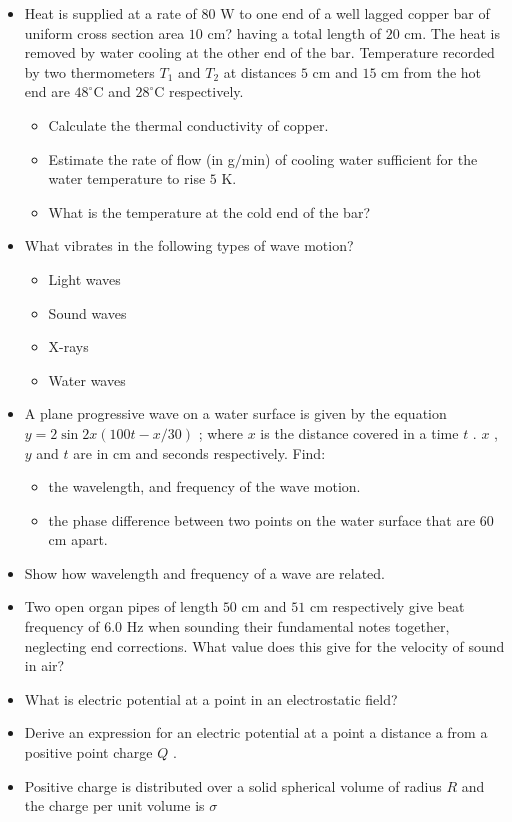 \documentclass{article}
\begin{document}
\begin{itemize}
\item Heat is supplied at a rate of $ 80$ W to one end of a well lagged copper bar of uniform cross section area $ 10$ cm? having a total length of $ 20$ cm. The heat is removed by water cooling at the other end of the bar. Temperature recorded by two thermometers $ T_{1}$ and $ T_{2}$ at distances $ 5$ cm and $ 15$ cm from the hot end are $ 48^{\circ}$C and $ 28^{\circ}$C respectively.
 \begin{itemize}
\item Calculate the thermal conductivity of copper.
\item Estimate the rate of flow (in g$/$min) of cooling water sufficient for the water temperature to rise $ 5$ K. 
\item What is the temperature at the cold end of the bar? 
\end{itemize}
\item What vibrates in the following types of wave motion?
 \begin{itemize}
\item Light waves
\item Sound waves
\item X-rays
\item Water waves
\end{itemize}
\item A plane progressive wave on a water surface is given by the equation $ y=2 \sin 2x(100t -x/30)$ ; where $ x$ is the distance covered in a time $ t$ . $ x$ , $ y$ and $ t$ are in cm and seconds respectively.  Find:
 \begin{itemize}
\item the wavelength, and frequency of the wave motion.
\item the phase difference between two points on the water surface that are $ 60$ cm apart.
\end{itemize}
\item Show how wavelength and frequency of a wave are related.
\item Two open organ pipes of length $ 50$ cm and $ 51$ cm respectively give beat frequency of $ 6.0$ Hz when sounding their fundamental notes together, neglecting end corrections. What value does this give for the velocity of sound in air?
\item What is electric potential at a point in an electrostatic field? 
\item Derive an expression for an electric potential at a point a distance a from a positive point charge $ Q$ .
\item Positive charge is distributed over a solid spherical volume of radius $ R$ and the charge per unit volume is $ \sigma $

\end{itemize}
\end{document}
